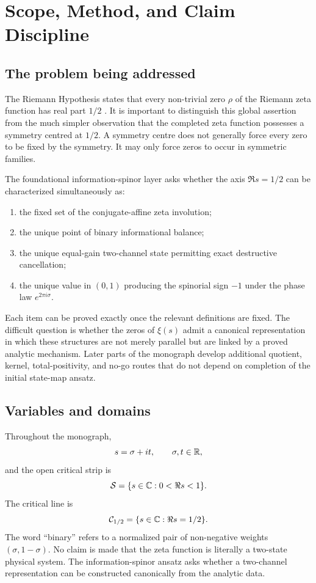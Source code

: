 \chapter{Scope, Method, and Claim Discipline}
\label{chap:scope}

\section{The problem being addressed}

The Riemann Hypothesis states that every non-trivial zero $\rho$ of the Riemann zeta function has real part $1/2$ \citep{riemann1859,clay2026}. It is important to distinguish this global assertion from the much simpler observation that the completed zeta function possesses a symmetry centred at $1/2$. A symmetry centre does not generally force every zero to be fixed by the symmetry. It may only force zeros to occur in symmetric families.

The foundational information-spinor layer asks whether the axis $\Re s=1/2$ can be characterized simultaneously as:
\begin{enumerate}
  \item the fixed set of the conjugate-affine zeta involution;
  \item the unique point of binary informational balance;
  \item the unique equal-gain two-channel state permitting exact destructive cancellation;
  \item the unique value in $(0,1)$ producing the spinorial sign $-1$ under the phase law $e^{2\pi i\sigma}$.
\end{enumerate}
Each item can be proved exactly once the relevant definitions are fixed. The difficult question is whether the zeros of $\xi(s)$ admit a canonical representation in which these structures are not merely parallel but are linked by a proved analytic mechanism. Later parts of the monograph develop additional quotient, kernel, total-positivity, and no-go routes that do not depend on completion of the initial state-map ansatz.

\section{Variables and domains}

Throughout the monograph,
\[
 s=\sigma+it,\qquad \sigma,t\in\mathbb{R},
\]
and the open critical strip is
\[
 \mathcal{S}=\{s\in\mathbb{C}:0<\Re s<1\}.
\]
The critical line is
\[
 \mathcal{C}_{1/2}=\{s\in\mathbb{C}:\Re s=1/2\}.
\]
The word ``binary'' refers to a normalized pair of non-negative weights $(\sigma,1-\sigma)$. No claim is made that the zeta function is literally a two-state physical system. The information-spinor ansatz asks whether a two-channel representation can be constructed canonically from the analytic data.

